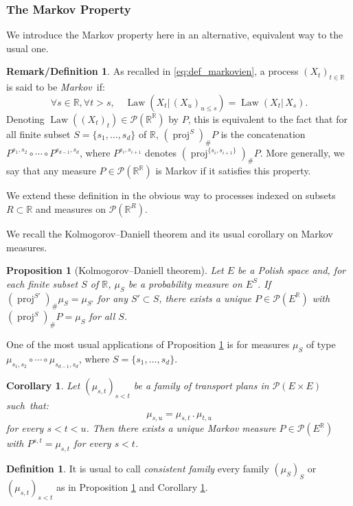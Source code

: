 \documentclass[JEP,XML,SOM,Unicode,NoEqCountersInSection,NoFloatCountersInSection,published]{cedram}
\newcommand{\ldot}{\mathbin{.}}
\theoremstyle{plain}
\newtheorem{pro}[them]{Proposition}
\newtheorem{cor}[them]{Corollary}
\theoremstyle{definition}
\newtheorem{defi}[them]{Definition}
\newtheorem{remdefi}[them]{Remark/Definition}
\newcommand{\p}{\mathcal{P}}
\newcommand{\R}{\mathbb{R}}
\newcommand{\law}{\operatorname{Law}}
\newcommand{\pr}{\operatorname{proj}}
\begin{document}
\subsubsection{The Markov Property}

We introduce the Markov property here in an alternative, equivalent way to the usual one.

\begin{remdefi}\label{defi:markov2}As recalled in \eqref{eq:def_markovien}, a process $(X_t)_{t\in\R}$ is said to be \emph{Markov}~if:\vspace*{-3pt}
\[
\forall s\in\R,\forall t>s,\quad \law(X_t|\,(X_{u})_{u\leqslant s})=\law(X_t|\,X_{s}).
\]
Denoting $\law((X_t)_t)\in\p(\R^\R)$ by $P$, this is equivalent to the fact that for all finite subset $S=\{s_1,\ldots,s_d\}$ of $\R$, $(\pr^S)_\#P$ is the concatenation $P^{s_1,s_2}\circ\cdots\circ P^{s_{d-1},s_d}$, where $P^{s_i,s_{i+1}}$ denotes $(\pr^{\{s_i,s_{i+1}\}})_\#P$. More generally, we say that any measure $P\in\p(\R^\R)$ is Markov if it satisfies this property.

We extend these definition in the obvious way to processes indexed on subsets $R\subset \R$ and measures on $\p(\R^R)$.
\end{remdefi}

We recall the Kolmogorov--Daniell theorem and its usual corollary on Markov measures.

\begin{pro}[Kolmogorov--Daniell theorem]\label{pro:inductive_limit}
Let $E$ be a Polish space and, for each finite subset $S$ of\/ $\R$, $\mu_S$ be a probability measure on $E^S$. If $(\pr^{S'})_\#\mu_S=\mu_{S'}$ for any $S'\subset S$, there exists a unique $P\in \p(E^\R)$ with $(\pr^S)_\#P=\mu_S$ for all $S$.
\end{pro}

One of the most usual applications of Proposition \ref{pro:inductive_limit} is for measures $\mu_S$ of type $\mu_{s_1,s_2}\circ\cdots\circ \mu_{s_{d-1},s_d}$, where $S=\{s_1,\ldots,s_d\}$.

\begin{cor}\label{cor:consist}
Let $(\mu_{s,t})_{s<t}$ be a family of transport plans in $\p(E\times E)$ such~that:\vspace*{-3pt}
\[\mu_{s,u}=\mu_{s,t}{}\ldot\mu_{t,u}\]
for every $s<t<u$. Then there exists a unique Markov measure $P\in \p(E^\R)$ with $P^{s,t}=\mu_{s,t}$ for every $s<t$.
\end{cor}

\begin{defi}\label{defi:consist}It is usual to call \emph{consistent family} every family $(\mu_S)_S$ or $(\mu_{s,t})_{s<t}$ as in Proposition \ref{pro:inductive_limit} and Corollary \ref{cor:consist}.
\end{defi}
\end{document}

